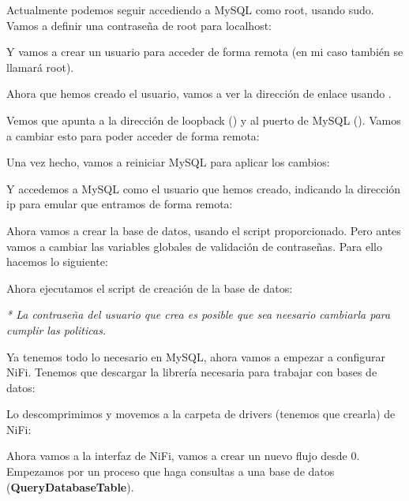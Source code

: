 \documentclass{../../miPlantilla}
\begin{document}
\newpage

Actualmente podemos seguir accediendo a MySQL como root, usando sudo. Vamos a definir una contraseña
de root para localhost:


Y vamos a crear un usuario para acceder de forma remota (en mi caso también se llamará root).


Ahora que hemos creado el usuario, vamos a ver la dirección de enlace usando .


Vemos que apunta a la dirección de loopback () y al puerto de MySQL ().
Vamos a cambiar esto para poder acceder de forma remota:


\newpage

Una vez hecho, vamos a reiniciar MySQL para aplicar los cambios:


Y accedemos a MySQL como el usuario que hemos creado, indicando la dirección ip para emular que entramos de forma remota:


Ahora vamos a crear la base de datos, usando el script proporcionado. Pero antes vamos a cambiar las variables globales de validación
de contraseñas. Para ello hacemos lo siguiente:


\newpage

Ahora ejecutamos el script de creación de la base de datos:


\textit{* La contraseña del usuario que crea es posible que sea neesario cambiarla para cumplir las politicas.}


\newpage

Ya tenemos todo lo necesario en MySQL, ahora vamos a empezar a configurar NiFi. Tenemos que descargar la librería necesaria para trabajar con bases de datos:


Lo descomprimimos y movemos a la carpeta de drivers (tenemos que crearla) de NiFi:


Ahora vamos a la interfaz de NiFi, vamos a crear un nuevo flujo desde 0. Empezamos por un proceso que haga consultas a una base de datos (\textbf{QueryDatabaseTable}).
\end{document}
